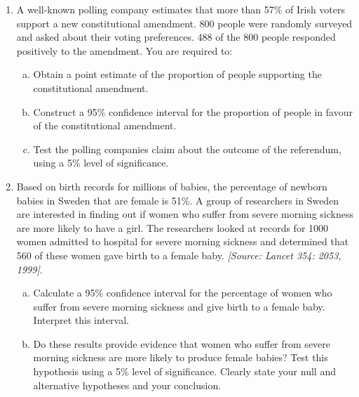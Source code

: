 \documentclass[]{article}
\begin{document}
\begin{enumerate}
\item 
A well-known polling company estimates that more than 57\% of Irish voters support a new constitutional amendment. 800 people were randomly surveyed and asked about their voting preferences. 488 of the 800 people responded positively to the amendment. You are required to: 
\begin{enumerate}[(a)]
\item Obtain a point estimate of the proportion of people supporting the constitutional amendment. 
\item Construct a 95\% confidence interval for the proportion of people in favour of the constitutional amendment.
\item Test the polling companies claim about the outcome of the referendum, using a 5\% level of significance.
\end{enumerate}
    \item Based on birth records for millions of babies, the percentage of newborn babies in Sweden that are female is 51\%. A group of researchers in Sweden are interested in finding out if women who suffer from severe morning sickness are more likely to have a girl. The researchers looked at records for 1000 women admitted to hospital for severe morning sickness and determined that 560 of these women gave birth to a female baby. \textit{[Source: Lancet 354: 2053, 1999]}.

\begin{enumerate}[(a)]
\item Calculate a 95\% confidence interval for the percentage of women who suffer from severe morning sickness and give birth to a female baby. Interpret this interval.


    \item Do these results provide evidence that women who suffer from severe morning sickness are more likely to produce female babies? Test this hypothesis using a 5\% level of significance. Clearly state your null and alternative hypotheses and your conclusion.


\end{enumerate}
\end{enumerate}
\end{document}
